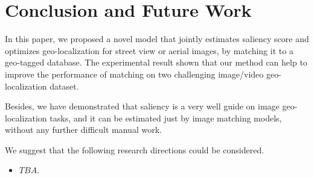 \section{Conclusion and Future Work}
\par
In this paper, we proposed a novel model that jointly estimates saliency score and optimizes geo-localization for street view or aerial images, by matching it to a geo-tagged database. The experimental result shown that our method can help to improve the performance of matching on two challenging image/video geo-localization dataset.
\par
Besides, we have demonstrated that saliency is a very well guide on image geo-localization tasks, and it can be estimated just by image matching models, without any further difficult manual work. 
\par
We suggest that the following research directions could be considered.
\begin{itemize}
\item $TBA$.
\end{itemize}
